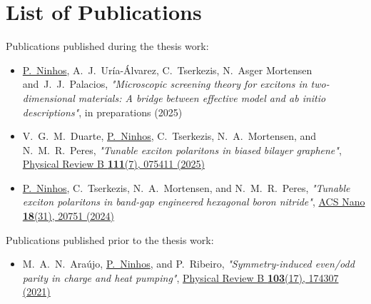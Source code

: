 \chapter*{List of Publications}

Publications published during the thesis work:

\begin{itemize}

    \item \underline{P.~Ninhos}, A.~J.~Ur\'ia-\'Alvarez, C.~Tserkezis, N.~Asger Mortensen and~J.~J.~Palacios, \emph{"Microscopic screening theory for excitons in two-dimensional materials: A bridge between effective model and ab initio descriptions"}, in preparations (2025)

    \item V.~G.~M.~Duarte, \underline{P.~Ninhos}, C.~Tserkezis, N.~A.~Mortensen, and N.~M.~R.~Peres, \emph{"Tunable exciton polaritons in biased bilayer graphene"}, \href{htps://doi.org/10.1103/PhysRevB.111.075411}{Physical Review B \textbf{111}(7), 075411 (2025)}

    \item \underline{P.~Ninhos}, C.~Tserkezis, N.~A.~Mortensen, and N.~M.~R.~Peres, \emph{"Tunable exciton polaritons in band-gap engineered hexagonal boron nitride"}, \href{htps://doi.org/10.1021/acsnano.4c07003}{ACS Nano \textbf{18}(31), 20751 (2024)}

\end{itemize}


Publications published prior to the thesis work:

\begin{itemize}
    \item M.~A.~N.~Araújo, \underline{P.~Ninhos}, and P.~Ribeiro, \emph{"Symmetry-induced even/odd parity in charge and heat pumping"}, \href{https://doi.org/10.1103/PhysRevB.103.174307}{Physical Review B \textbf{103}(17), 174307 (2021)}
\end{itemize}


